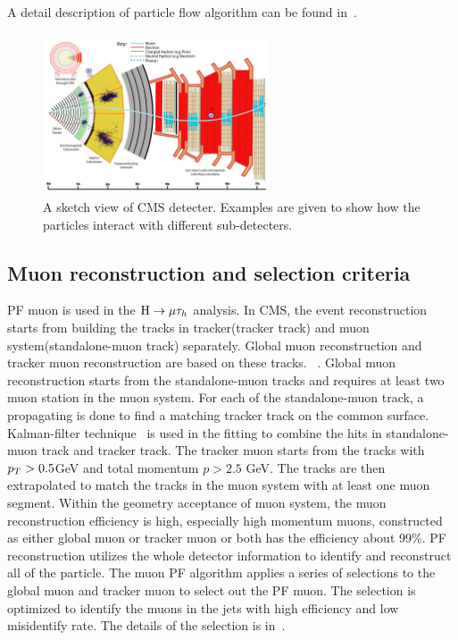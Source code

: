 A detail description of particle flow algorithm can be found in~\cite{CMS_PRF_14_001}.

\begin{figure}[htbp] 
\centering
\includegraphics[width=0.6\textwidth]{chapter4/CMS_detecter_slice.pdf}
\caption{A sketch view of CMS detecter. Examples are given to show how the particles interact with different sub-detecters.}
\label{fig:CMSslice}
\end{figure}



\subsection{Muon reconstruction and selection criteria}

PF muon is used in the $\mathrm{H}\to \mu\tau_{h}$ analysis. In CMS, the event reconstruction starts from building the tracks in tracker(tracker track) and muon system(standalone-muon track) separately. Global muon reconstruction and tracker muon reconstruction are based on these tracks. ~\cite{muonreco}. Global muon reconstruction starts from the standalone-muon tracks and requires at least two muon station in the muon system. For each of the standalone-muon track, a propagating is done to find a matching tracker track on the common surface. Kalman-filter technique~\cite{Fruhwirth:1987fm} is used in the fitting to combine the hits in standalone-muon track and tracker track. The tracker muon starts from the tracks with $p_{T}>0.5$GeV and total momentum $p>2.5$ GeV. The tracks are then extrapolated to match the tracks in the muon system with at least one muon segment.  Within the geometry acceptance of muon system, the muon reconstruction efficiency is high, especially high momentum muons, constructed as either global muon or tracker muon or both has the  efficiency about 99\%.  PF reconstruction utilizes the whole detector information to identify and reconstruct all of the particle. The muon PF algorithm applies a series of selections to the global muon and tracker muon to select out the PF muon. The selection is optimized to identify the muons in the jets with high efficiency and low misidentify rate. The details of the selection is in~\cite{PFmuonselection}.   



